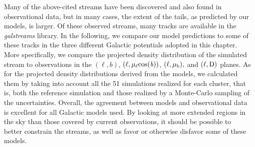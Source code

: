             Many of the above-cited streams have been discovered and also found  in observational data, but in many cases, the extent of the tails, as predicted by our models, is larger. Of these observed streams, many tracks are available in the \textit{galstreams} \citep{2023MNRAS.520.5225M} library. In the following, we compare our model predictions to some of these tracks in the three different Galactic potentials adopted in this chapter. More specifically, we compare the projected density distribution of the simulated stream to observations in the $(\ell, b)$, $(\ell,  \rm \mu_{\ell}cos(\mathit{b}))$, $(\ell, \rm \mu_b),$ and $(\ell, \rm D)$ planes. As for the projected density distributions derived from the models, we calculated them by taking into account all the 51 simulations realized for each cluster, that is, both the reference simulation and those realized by a Monte-Carlo sampling of the uncertainties. Overall, the agreement between models and observational data is excellent for all Galactic models used. By looking at more extended regions in the sky than those covered by current observations, it should be possible to better constrain the streams, as well as favor or otherwise disfavor some of these models.

